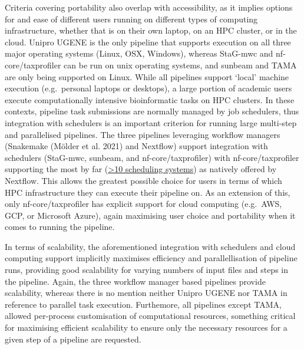 \documentclass[
]{article}
\begin{document}
Criteria covering portability also overlap with accessibility, as it
implies options for and ease of different users running on different
types of computing infrastructure, whether that is on their own laptop,
on an HPC cluster, or in the cloud. Unipro UGENE is the only pipeline
that supports execution on all three major operating systems (Linux,
OSX, Windows), whereas StaG-mwc and nf-core/taxprofiler can be run on
unix operating systems, and sunbeam and TAMA are only being supported on
Linux. While all pipelines support `local' machine execution
(e.g.~personal laptops or desktops), a large portion of academic users
execute computationally intensive bioinformatic tasks on HPC clusters.
In these contexts, pipeline task submissions are normally managed by job
schedulers, thus integration with schedulers is an important criterion
for running large multi-step and parallelised pipelines. The three
pipelines leveraging workflow managers (Snakemake (Mölder et al. 2021)
and Nextflow) support integration with schedulers (StaG-mwc, sunbeam,
and nf-core/taxprofiler) with nf-core/taxprofiler supporting the most by
far
(\href{https://www.nextflow.io/docs/latest/executor.html}{\textgreater10
scheduling systems}) as natively offered by Nextflow. This allows the
greatest possible choice for users in terms of which HPC infrastructure
they can execute their pipeline on. As an extension of this, only
nf-core/taxprofiler has explicit support for cloud computing (e.g.~AWS,
GCP, or Microsoft Azure), again maximising user choice and portability
when it comes to running the pipeline.

In terms of scalability, the aforementioned integration with schedulers
and cloud computing support implicitly maximises efficiency and
parallellisation of pipeline runs, providing good scalability for
varying numbers of input files and steps in the pipeline. Again, the
three workflow manager based pipelines provide scalability, whereas
there is no mention neither Unipro UGENE nor TAMA in reference to
parallel task execution. Furthemore, all pipelines except TAMA, allowed
per-process customisation of computational resources, something critical
for maximising efficient scalability to ensure only the necessary
resources for a given step of a pipeline are requested.
\end{document}
